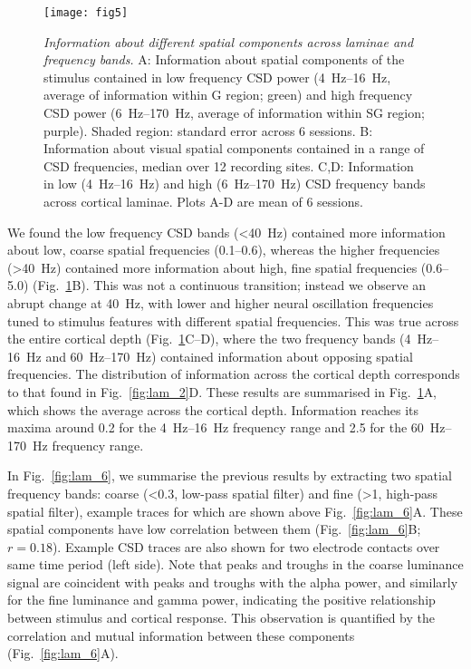 \begin{figure}[htbp]
\centering \texttt{[image: fig5]}
%
\caption{%
\textit{Information about different spatial components across laminae and frequency bands.}
A: Information about spatial components of the stimulus contained in 
low frequency \ac{CSD} power (\SIrange{4}{16}{Hz}, average of information within \ac{G} region; green) and high 
frequency \ac{CSD} power (\SIrange{6}{170}{Hz}, average of information within \ac{SG} region; purple).
Shaded region: standard error across 6 sessions.
B: Information about visual spatial components contained in a range of \ac{CSD} frequencies, median over 12 recording sites.
C,D: Information in low (\SIrange{4}{16}{Hz}) and high (\SIrange{6}{170}{Hz}) 
\ac{CSD} frequency bands across cortical laminae.
Plots A-D are mean of 6 sessions.}%
\label{fig:lam_5}
%
\end{figure}

We found the low frequency \ac{CSD} bands (\SI{<40}{Hz}) contained more information about low, coarse spatial frequencies (\SIrange{0.1}{0.6}{\cpd}), whereas the higher frequencies (\SI{>40}{Hz}) contained more information about high, fine spatial frequencies (\SIrange{0.6}{5.0}{\cpd}) (Fig.~\ref{fig:lam_5}B).
This was not a continuous transition; instead we observe an abrupt change at \SI{40}{Hz}, with lower and higher neural oscillation frequencies tuned to stimulus features with different spatial frequencies.
This was true across the entire cortical depth (Fig.~\ref{fig:lam_5}C--D), where the two frequency bands (\SIrange{4}{16}{Hz} and \SIrange{60}{170}{Hz}) contained information about opposing spatial frequencies.
The distribution of information across the cortical depth corresponds to that found in Fig.~\ref{fig:lam_2}D.
These results are summarised in Fig.~\ref{fig:lam_5}A, which shows the average across the cortical depth.
Information reaches its maxima around \SI{0.2}{\cpd} for the \SIrange{4}{16}{Hz} frequency range and \SI{2.5}{\cpd} for the \SIrange{60}{170}{Hz} frequency range.

In Fig.~\ref{fig:lam_6}, we summarise the previous results by extracting two spatial frequency bands: coarse (\SI{<0.3}{\cpd}, low-pass spatial filter) and fine (\SI{>1}{\cpd}, high-pass spatial filter), example traces for which are shown above Fig.~\ref{fig:lam_6}A.
These spatial components have low correlation between them (Fig.~\ref{fig:lam_6}B; $r=0.18$).
Example \ac{CSD} traces are also shown for two electrode contacts over same time period (left side).
Note that peaks and troughs in the coarse luminance signal are coincident with peaks and troughs with the alpha power, and similarly for the fine luminance and gamma power, indicating the positive relationship between stimulus and cortical response.
This observation is quantified by the correlation and mutual information between these components (Fig.~\ref{fig:lam_6}A).


